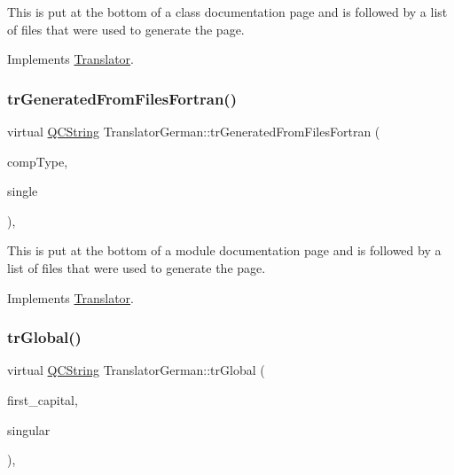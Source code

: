 This is put at the bottom of a class documentation page and is followed by a list of files that were used to generate the page. 

Implements \mbox{\hyperlink{class_translator}{Translator}}.

\mbox{\label{class_translator_german_a864b222b989a57e263dc99de282bab9f}} 
\subsubsection{\texorpdfstring{trGeneratedFromFilesFortran()}{trGeneratedFromFilesFortran()}}
{\footnotesize\ttfamily virtual \mbox{\hyperlink{class_q_c_string}{Q\+C\+String}} Translator\+German\+::tr\+Generated\+From\+Files\+Fortran (\begin{DoxyParamCaption}\item[{\mbox{\hyperlink{class_class_def_ae70cf86d35fe954a94c566fbcfc87939}{Class\+Def\+::\+Compound\+Type}}}]{comp\+Type,  }\item[{bool}]{single }\end{DoxyParamCaption})\hspace{0.3cm}{\ttfamily [inline]}, {\ttfamily [virtual]}}

This is put at the bottom of a module documentation page and is followed by a list of files that were used to generate the page. 

Implements \mbox{\hyperlink{class_translator}{Translator}}.

\mbox{\label{class_translator_german_ac202e603ffb1afdfd0d2d2b817a9a5bc}} 
\subsubsection{\texorpdfstring{trGlobal()}{trGlobal()}}
{\footnotesize\ttfamily virtual \mbox{\hyperlink{class_q_c_string}{Q\+C\+String}} Translator\+German\+::tr\+Global (\begin{DoxyParamCaption}\item[{bool}]{first\+\_\+capital,  }\item[{bool}]{singular }\end{DoxyParamCaption})\hspace{0.3cm}{\ttfamily [inline]}, {\ttfamily [virtual]}}

